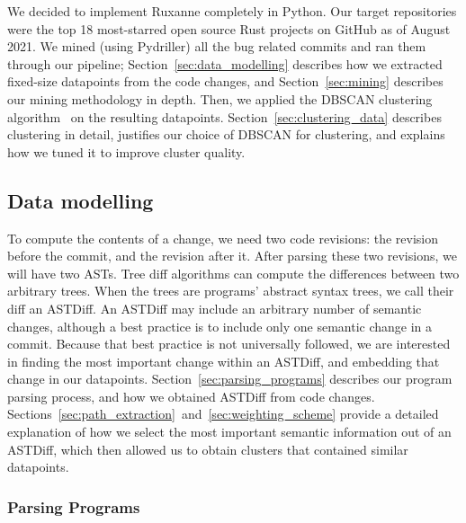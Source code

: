 We decided to implement Ruxanne completely in Python. Our target repositories were the top 18 most-starred open source Rust projects on GitHub as of August 2021. We mined (using Pydriller) all the bug related commits and ran them through our pipeline; Section~\ref{sec:data_modelling} describes how we extracted fixed-size datapoints from the code changes, and Section~\ref{sec:mining} describes our mining methodology in depth. Then, we applied the DBSCAN clustering algorithm~\citep{ester1996density} on the resulting datapoints. Section~\ref{sec:clustering_data} describes clustering in detail, justifies our choice of DBSCAN for clustering, and explains how we tuned it to improve cluster quality. 

\subsection{\label{sec:data_modelling}Data modelling}

To compute the contents of a change, we need two code revisions: the revision before the commit, and the revision after it. After parsing these two revisions, we will have two ASTs. Tree diff algorithms can compute the differences between two arbitrary trees. When the trees are programs' abstract syntax trees, we call their diff an ASTDiff. An ASTDiff may include an arbitrary number of semantic changes, although a best practice is to include only one semantic change in a commit. Because that best practice is not universally followed, we are interested in finding the most important change within an ASTDiff, and embedding that change in our datapoints. Section~\ref{sec:parsing_programs} describes our program parsing process, and how we obtained ASTDiff from code changes. Sections~\ref{sec:path_extraction}~and~\ref{sec:weighting_scheme} provide a detailed explanation of how we select the most important semantic information out of an ASTDiff, which then allowed us to obtain clusters that contained similar datapoints. 


\subsubsection{\label{sec:parsing_programs}Parsing Programs}

